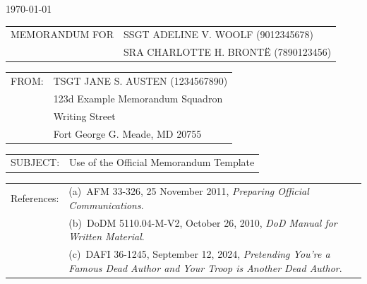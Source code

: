 \documentclass[12pt]{article}
\newlength{\baseSpaceLength}
\newcommand{\spaceLength}[1]{\dimexpr #1\baseSpaceLength\relax} %
\newcommand{\setcolumnwidth}[2]{
    \newlength{#1}%
    \settowidth{#1}{#2}%
    \addtolength{#1}{\spaceLength{2}} %
}
\begin{document}
\pagestyle{default}
\thispagestyle{firstpage}
\RaggedRight

\noindent\hfill\DTG\today

\setcolumnwidth{\memoWidth}{MEMORANDUM FOR}
\noindent
\begin{tabularx}{\textwidth}{@{} p{\memoWidth} @{} >{\raggedright\arraybackslash}X @{}} 
MEMORANDUM FOR & SSGT ADELINE V. WOOLF (9012345678)\\
               & SRA CHARLOTTE H. BRONTË (7890123456)\\
\end{tabularx}

\setcolumnwidth{\fromWidth}{FROM:}
\noindent
\begin{tabularx}{\textwidth}{@{} p{\fromWidth} @{} >{\raggedright\arraybackslash}X @{}} 
FROM: & TSGT JANE S. AUSTEN (1234567890)\\
      & 123d Example Memorandum Squadron\\
      & 4567 Writing Street\\
      & Fort George G. Meade, MD 20755\\
\end{tabularx}

\setcolumnwidth{\subjectWidth}{SUBJECT:}
\noindent
\begin{tabularx}{\textwidth}{@{} p{\subjectWidth} @{} >{\raggedright\arraybackslash}X @{}} 
SUBJECT: & Use of the Official Memorandum Template\\
\end{tabularx}

\setcolumnwidth{\referencesWidth}{References:}
\noindent
\begin{tabularx}{\textwidth}{@{} p{} @{} >{\raggedright\arraybackslash}X @{}}
References: & (a)~AFM 33-326, 25 November 2011, \textit{Preparing Official Communications}.\\
            & (b)~DoDM 5110.04-M-V2, October 26, 2010, \textit{DoD Manual for Written Material}.\\
            & (c)~DAFI 36-1245, September 12, 2024, \textit{Pretending You're a Famous Dead Author and Your Troop is Another Dead Author}.\\
\end{tabularx}
\end{document}
